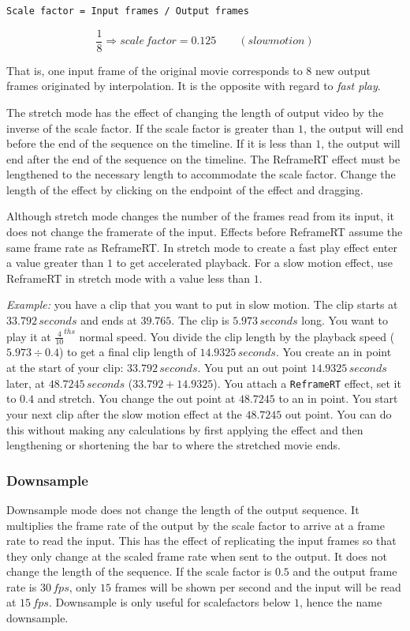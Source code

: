 \vspace{1ex} \texttt{Scale factor = Input frames / Output frames}

\[\frac{1}{8} \Rightarrow scale\, factor = 0.125 \qquad (slowmotion)\]

That is, one input frame of the original movie corresponds to $8$ new output frames originated by interpolation. It is the opposite with regard to \textit{fast play}.

The stretch mode has the effect of changing the length of output video by the inverse of the scale factor. If the scale factor is greater than $1$, the output will end before the end of the sequence on the timeline. If it is less than $1$, the output will end after the end of the sequence on the timeline. The ReframeRT effect must be lengthened to the necessary length to accommodate the scale factor. Change the length of the effect by clicking on the endpoint of the effect and dragging.

Although stretch mode changes the number of the frames read from its input, it does not change the framerate of the input. Effects before ReframeRT assume the same frame rate as ReframeRT.
In stretch mode to create a fast play effect enter a value greater than $1$ to get accelerated playback.
For a slow motion effect, use ReframeRT in stretch mode with a value less than $1$.

\textit{Example:} you have a clip that you want to put in slow motion. The clip starts at $33.792\, seconds$ and ends at $39.765$. The clip is $5.973\, seconds$ long. You want to play it at $\frac{4}{10}^{ths}$ normal speed. You divide the clip length by the playback speed ($5.973\div0.4$) to get a final clip length of $14.9325\,seconds$. You create an in point at the start of your clip: $33.792\,seconds$. You put an out point $14.9325\,seconds$ later, at $48.7245\,seconds$ ($33.792 + 14.9325$). You attach a \texttt{ReframeRT} effect, set it to $0.4$ and stretch. You change the out point at $48.7245$ to an in point. You start your next clip after the slow motion effect at the $48.7245$ out point. You can do this without making any calculations by first applying the effect and then lengthening or shortening the bar to where the stretched movie ends.

\subsubsection*{Downsample}%
\label{ssub:downsample}

Downsample mode does not change the length of the output sequence. It multiplies the frame rate of the output by the scale factor to arrive at a frame rate to read the input. This has the effect of replicating the input frames so that they only change at the scaled frame rate when sent to the output. It does not change the length of the sequence. If the scale factor is $0.5$ and the output frame rate is $30 \,fps$, only $15$ frames will be shown per second and the input will be read at $15 \,fps$. Downsample is only useful for scalefactors below $1$, hence the name downsample.

